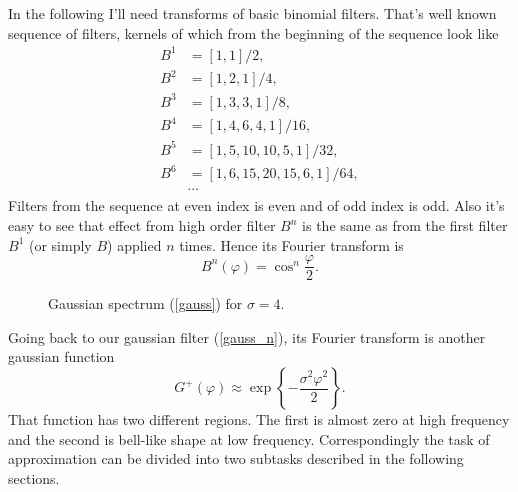 \documentclass[10pt]{article}
\begin{document}
In the following I'll need transforms of basic binomial filters. That's well known sequence of
filters, kernels of which from the beginning of the sequence look like
\begin{align}
    \label{B1} B^1 &= [1, 1] / 2,\\
    \label{B2} B^2 &= [1, 2, 1] / 4,\\
    \label{B3} B^3 &= [1, 3, 3, 1] / 8,\\
    \label{B4} B^4 &= [1, 4, 6, 4, 1] / 16,\\
    \label{B5} B^5 &= [1, 5, 10, 10, 5, 1] / 32,\\
    \label{B6} B^6 &= [1, 6, 15, 20, 15, 6, 1] / 64,\\
                   &\cdots\nonumber
\end{align}
Filters from the sequence at even index is even and of odd index is odd. Also it's easy to see that
effect from high order filter $B^n$ is the same as from the first filter $B^1$ (or simply $B$) applied
$n$ times. Hence its Fourier transform is
\begin{equation}
    B^n(\varphi) = \cos^n\frac\varphi2.
\end{equation}

\begin{wrapfigure}{r}{0pt}
    \caption{Gaussian spectrum (\ref{gauss}) for $\sigma = 4$.}
\end{wrapfigure}

Going back to our gaussian filter (\ref{gauss_n}), its Fourier transform is another gaussian function
\begin{equation}\label{gauss}
    G^+(\varphi) \approx \exp\left\{-\frac{\sigma^2\varphi^2}2\right\}.
\end{equation}
That function has two different regions. The first is almost zero at high frequency and the second
is bell-like shape at low frequency. Correspondingly the task of approximation can be divided into
two subtasks described in the following sections.
\end{document}
